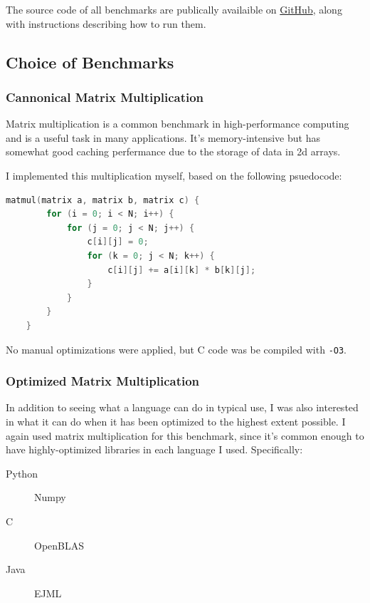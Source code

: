 \documentclass[12pt,letterpaper]{article}
\begin{document}
The source code of all benchmarks are publically availaible on
\href{https://github.com/JasonSauntry/performance-of-programming-languages}{GitHub},
along with instructions describing how to run them.



\subsection{Choice of Benchmarks}

\subsubsection{Cannonical Matrix Multiplication}

Matrix multiplication is a common benchmark in high-performance computing and is
a useful task in many applications. It's memory-intensive but has somewhat good
caching perfermance due to the storage of data in 2d arrays.

I implemented this multiplication myself, based on the following psuedocode:

\begin{lstlisting}[language=c]
	matmul(matrix a, matrix b, matrix c) {
		for (i = 0; i < N; i++) {
			for (j = 0; j < N; j++) {
				c[i][j] = 0;
				for (k = 0; j < N; k++) {
					c[i][j] += a[i][k] * b[k][j];
				}
			}
		}
	}
\end{lstlisting}

No manual optimizations were applied, but C code was be compiled with
\texttt{-O3}.

\subsubsection{Optimized Matrix Multiplication}

In addition to seeing what a language can do in typical use, I was also
interested in what it can do when it has been optimized to the highest extent
possible. I again used matrix multiplication for this benchmark, since it's
common enough to have highly-optimized libraries in each language I used.
Specifically:

\begin{description}
	\item [Python] Numpy
	\item [C] OpenBLAS
	\item [Java] EJML
\end{description}
\end{document}
